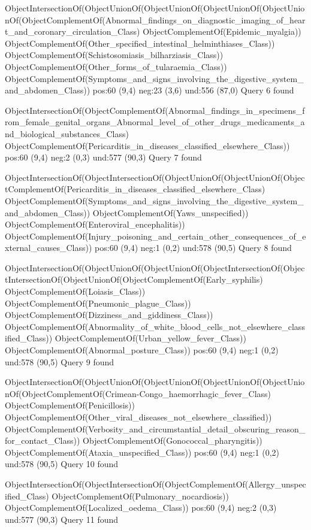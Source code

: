 ObjectIntersectionOf(ObjectUnionOf(ObjectUnionOf(ObjectUnionOf(ObjectUnionOf(ObjectComplementOf(Abnormal_findings_on_diagnostic_imaging_of_heart_and_coronary_circulation_Class) ObjectComplementOf(Epidemic_myalgia)) ObjectComplementOf(Other_specified_intestinal_helminthiases_Class)) ObjectComplementOf(Schistosomiasis_bilharziasis_Class)) ObjectComplementOf(Other_forms_of_tularaemia_Class)) ObjectComplementOf(Symptoms_and_signs_involving_the_digestive_system_and_abdomen_Class))
pos:60 (9,4)		 neg:23 (3,6)		 und:556 (87,0)
Query 6 found

ObjectIntersectionOf(ObjectComplementOf(Abnormal_findings_in_specimens_from_female_genital_organs_Abnormal_level_of_other_drugs_medicaments_and_biological_substances_Class) ObjectComplementOf(Pericarditis_in_diseases_classified_elsewhere_Class))
pos:60 (9,4)		 neg:2 (0,3)		 und:577 (90,3)
Query 7 found

ObjectIntersectionOf(ObjectIntersectionOf(ObjectUnionOf(ObjectUnionOf(ObjectComplementOf(Pericarditis_in_diseases_classified_elsewhere_Class) ObjectComplementOf(Symptoms_and_signs_involving_the_digestive_system_and_abdomen_Class)) ObjectComplementOf(Yaws_unspecified)) ObjectComplementOf(Enteroviral_encephalitis)) ObjectComplementOf(Injury_poisoning_and_certain_other_consequences_of_external_causes_Class))
pos:60 (9,4)		 neg:1 (0,2)		 und:578 (90,5)
Query 8 found

ObjectIntersectionOf(ObjectUnionOf(ObjectUnionOf(ObjectIntersectionOf(ObjectIntersectionOf(ObjectUnionOf(ObjectComplementOf(Early_syphilis) ObjectComplementOf(Loiasis_Class)) ObjectComplementOf(Pneumonic_plague_Class)) ObjectComplementOf(Dizziness_and_giddiness_Class)) ObjectComplementOf(Abnormality_of_white_blood_cells_not_elsewhere_classified_Class)) ObjectComplementOf(Urban_yellow_fever_Class)) ObjectComplementOf(Abnormal_posture_Class))
pos:60 (9,4)		 neg:1 (0,2)		 und:578 (90,5)
Query 9 found

ObjectIntersectionOf(ObjectUnionOf(ObjectUnionOf(ObjectUnionOf(ObjectUnionOf(ObjectComplementOf(Crimean-Congo_haemorrhagic_fever_Class) ObjectComplementOf(Penicillosis)) ObjectComplementOf(Other_viral_diseases_not_elsewhere_classified)) ObjectComplementOf(Verbosity_and_circumstantial_detail_obscuring_reason_for_contact_Class)) ObjectComplementOf(Gonococcal_pharyngitis)) ObjectComplementOf(Ataxia_unspecified_Class))
pos:60 (9,4)		 neg:1 (0,2)		 und:578 (90,5)
Query 10 found

ObjectIntersectionOf(ObjectIntersectionOf(ObjectComplementOf(Allergy_unspecified_Class) ObjectComplementOf(Pulmonary_nocardiosis)) ObjectComplementOf(Localized_oedema_Class))
pos:60 (9,4)		 neg:2 (0,3)		 und:577 (90,3)
Query 11 found


